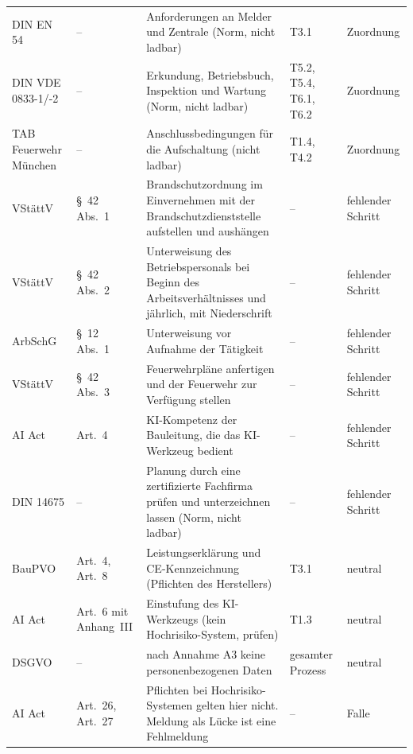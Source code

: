 \begin{small}
\begin{longtable}{@{}>{\raggedright\arraybackslash}p{1.9cm}>{\raggedright\arraybackslash}p{2.4cm}>{\raggedright\arraybackslash}p{5.5cm}>{\raggedright\arraybackslash}p{2.4cm}>{\raggedright\arraybackslash}p{2.0cm}@{}}
DIN EN 54 & -- & Anforderungen an Melder und Zentrale (Norm, nicht ladbar) & T3.1 & Zuordnung \\
DIN VDE 0833-1/-2 & -- & Erkundung, Betriebsbuch, Inspektion und Wartung (Norm, nicht ladbar) & T5.2, T5.4, T6.1, T6.2 & Zuordnung \\
TAB Feuerwehr München & -- & Anschlussbedingungen für die Aufschaltung (nicht ladbar) & T1.4, T4.2 & Zuordnung \\
VStättV & §~42 Abs.~1 & Brandschutzordnung im Einvernehmen mit der Brandschutzdienststelle aufstellen und aushängen & -- & fehlender Schritt \\
VStättV & §~42 Abs.~2 & Unterweisung des Betriebspersonals bei Beginn des Arbeitsverhältnisses und jährlich, mit Niederschrift & -- & fehlender Schritt \\
ArbSchG & §~12 Abs.~1 & Unterweisung vor Aufnahme der Tätigkeit & -- & fehlender Schritt \\
VStättV & §~42 Abs.~3 & Feuerwehrpläne anfertigen und der Feuerwehr zur Verfügung stellen & -- & fehlender Schritt \\
AI Act & Art.~4 & KI-Kompetenz der Bauleitung, die das KI-Werkzeug bedient & -- & fehlender Schritt \\
DIN 14675 & -- & Planung durch eine zertifizierte Fachfirma prüfen und unterzeichnen lassen (Norm, nicht ladbar) & -- & fehlender Schritt \\
BauPVO & Art.~4, Art.~8 & Leistungserklärung und CE-Kennzeichnung (Pflichten des Herstellers) & T3.1 & neutral \\
AI Act & Art.~6 mit Anhang~III & Einstufung des KI-Werkzeugs (kein Hochrisiko-System, prüfen) & T1.3 & neutral \\
DSGVO & -- & nach Annahme A3 keine personenbezogenen Daten & gesamter Prozess & neutral \\
AI Act & Art.~26, Art.~27 & Pflichten bei Hochrisiko-Systemen gelten hier nicht. Meldung als Lücke ist eine Fehlmeldung & -- & Falle \\
\end{longtable}
\end{small}
